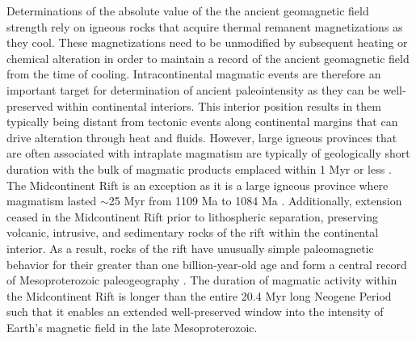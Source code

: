 \documentclass[9pt,twocolumn,twoside,lineno]{pnas-new}
\begin{document}
Determinations of the absolute value of the the ancient geomagnetic field strength rely on igneous rocks that acquire thermal remanent magnetizations as they cool. These magnetizations need to be unmodified by subsequent heating or chemical alteration in order to maintain a record of the ancient geomagnetic field from the time of cooling. Intracontinental magmatic events are therefore an important target for determination of ancient paleointensity as they can be well-preserved within continental interiors. This interior position results in them typically being distant from tectonic events along continental margins that can drive alteration through heat and fluids. However, large igneous provinces that are often associated with intraplate magmatism are typically of geologically short duration with the bulk of magmatic products emplaced within 1 Myr or less \cite{Kasbohm2021a}. The Midcontinent Rift is an exception as it is a large igneous province where magmatism lasted $\sim$25 Myr from  1109 Ma to 1084 Ma \cite{Swanson-Hysell2019a}. Additionally, extension ceased in the Midcontinent Rift prior to lithospheric separation, preserving volcanic, intrusive, and sedimentary rocks of the rift within the continental interior. As a result, rocks of the rift have unusually simple paleomagnetic behavior for their greater than one billion-year-old age and form a central record of Mesoproterozoic paleogeography \cite{Swanson-Hysell2021c}. The duration of magmatic activity within the Midcontinent Rift is longer than the entire 20.4 Myr long Neogene Period such that it enables an extended well-preserved window into the intensity of Earth's magnetic field in the late Mesoproterozoic. 
\end{document}
